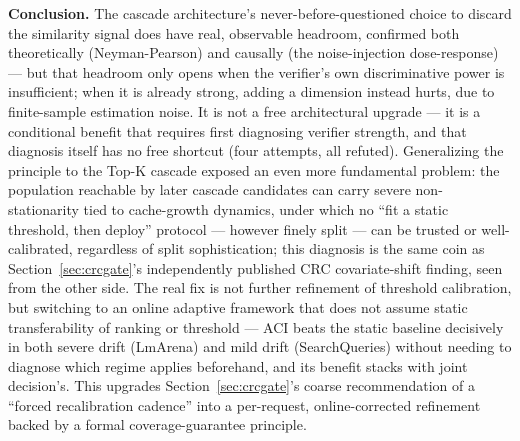 \documentclass[11pt]{article}
\begin{document}
\textbf{Conclusion.} The cascade architecture's never-before-questioned choice to discard the similarity signal does have real, observable headroom, confirmed both theoretically (Neyman-Pearson) and causally (the noise-injection dose-response) --- but that headroom only opens when the verifier's own discriminative power is insufficient; when it is already strong, adding a dimension instead hurts, due to finite-sample estimation noise. It is not a free architectural upgrade --- it is a conditional benefit that requires first diagnosing verifier strength, and that diagnosis itself has no free shortcut (four attempts, all refuted). Generalizing the principle to the Top-K cascade exposed an even more fundamental problem: the population reachable by later cascade candidates can carry severe non-stationarity tied to cache-growth dynamics, under which no ``fit a static threshold, then deploy'' protocol --- however finely split --- can be trusted or well-calibrated, regardless of split sophistication; this diagnosis is the same coin as Section~\ref{sec:crcgate}'s independently published CRC covariate-shift finding, seen from the other side. The real fix is not further refinement of threshold calibration, but switching to an online adaptive framework that does not assume static transferability of ranking or threshold --- ACI beats the static baseline decisively in both severe drift (LmArena) and mild drift (SearchQueries) without needing to diagnose which regime applies beforehand, and its benefit stacks with joint decision's. This upgrades Section~\ref{sec:crcgate}'s coarse recommendation of a ``forced recalibration cadence'' into a per-request, online-corrected refinement backed by a formal coverage-guarantee principle.
\end{document}
